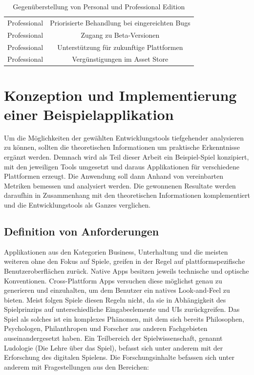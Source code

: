 \begin{table}[htbp]
{\begin{tabular}{cc}
			\rowcolor[HTML]{C0C0C0} 
			Professional                            & Priorisierte Behandlung bei eingereichten Bugs                                                                                        \\
			Professional                            & Zugang zu Beta-Versionen                                                                                                              \\
			\rowcolor[HTML]{C0C0C0} 
			Professional                            & Unterstützung für zukunftige Plattformen                                                                                              \\
			Professional                            & Vergünstigungen im Asset Store                                                                                                       
		\end{tabular}
	}
	\caption{Gegenüberstellung von Personal und Professional Edition}
	\label{Unity_Produkte}\citep{unity_products}
\end{table}


\chapter{Konzeption und Implementierung einer Beispielapplikation}
Um die Möglichkeiten der gewählten Entwicklungstools tiefgehender analysieren zu können, sollten die theoretischen Informationen um praktische Erkenntnisse ergänzt werden. Demnach wird als Teil dieser Arbeit ein Beispiel-Spiel konzipiert, mit den jeweiligen Tools umgesetzt und daraus Applikationen für verschiedene Plattformen erzeugt. Die Anwendung soll dann Anhand von vereinbarten Metriken bemessen und analysiert werden. Die gewonnenen Resultate werden daraufhin in Zusammenhang mit den theoretischen Informationen komplementiert und die Entwicklungstools als Ganzes verglichen. 

\section{Definition von Anforderungen}
\label{sec:definition_anforderungen}
Applikationen aus den Kategorien Business, Unterhaltung und die meisten weiteren ohne den Fokus auf Spiele, greifen in der Regel auf plattformspezifische Benutzeroberflächen zurück. Native Apps besitzen jeweils technische und optische Konventionen. Cross-Plattform Apps versuchen diese möglichst genau zu generieren und einzuhalten, um dem Benutzer ein natives Look-and-Feel zu bieten. 
Meist folgen Spiele diesen Regeln nicht, da sie in Abhängigkeit des Spielprinzips auf unterschiedliche Eingabeelemente und UIs zurückgreifen. 
Das Spiel als solches ist ein komplexes Phänomen, mit dem sich bereits Philosophen, Psychologen, Philanthropen und Forscher aus anderen Fachgebieten auseinandergesetzt haben. Ein Teilbereich der Spielwissenschaft, genannt Ludologie (Die Lehre über das Spiel), befasst sich unter anderem mit der Erforschung des digitalen Spielens. \citep{ludologie} Die Forschungsinhalte befassen sich unter anderem mit Fragestellungen aus den Bereichen:

